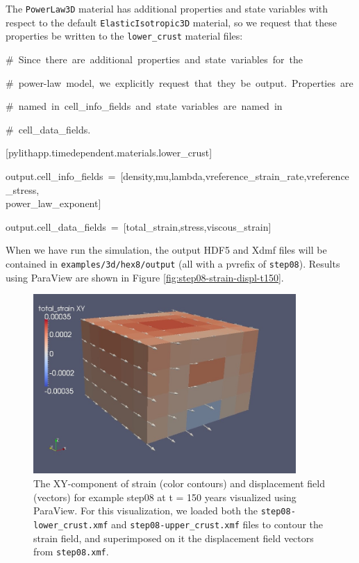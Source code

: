 The \texttt{PowerLaw3D} material has additional properties and state
variables with respect to the default \texttt{ElasticIsotropic3D}
material, so we request that these properties be written to the \texttt{lower\_crust}
material files:
\begin{lyxcode}
\#~Since~there~are~additional~properties~and~state~variables~for~the

\#~power-law~model,~we~explicitly~request~that~they~be~output.~Properties~are

\#~named~in~cell\_info\_fields~and~state~variables~are~named~in

\#~cell\_data\_fields.

{[}pylithapp.timedependent.materials.lower\_crust{]}

output.cell\_info\_fields~=~{[}density,mu,lambda,vreference\_strain\_rate,vreference\_stress,~\\
power\_law\_exponent{]}

output.cell\_data\_fields~=~{[}total\_strain,stress,viscous\_strain{]}
\end{lyxcode}
When we have run the simulation, the output HDF5 and Xdmf files will
be contained in \texttt{examples/3d/hex8/output} (all with a pvrefix
of \texttt{step08}). Results using ParaView are shown in Figure \vref{fig:step08-strain-displ-t150}.
\begin{figure}
\centering{}\includegraphics[width=10cm]{tutorials/3dhex8/figs/step08-strain-displ-t150}\caption{The XY-component of strain (color contours) and displacement field
(vectors) for example step08 at t = 150 years visualized using ParaView.
For this visualization, we loaded both the \texttt{step08-lower\_crust.xmf}
and \texttt{step08-upper\_crust.xmf} files to contour the strain field,
and superimposed on it the displacement field vectors from \texttt{step08.xmf}.\label{fig:step08-strain-displ-t150}}
\end{figure}



